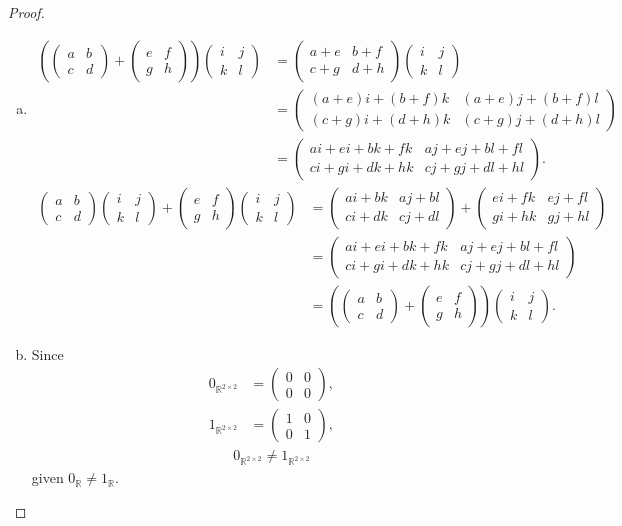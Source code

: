 \documentclass{amsart}
\newcommand{\bbr}{\mathbb{R}}
\newcommand{\aaa}{\left(\begin{smallmatrix}a&b\\c&d\end{smallmatrix}\right)}
\newcommand{\bbb}{\left(\begin{smallmatrix}e&f\\g&h\end{smallmatrix}\right)}
\newcommand{\ccc}{\left(\begin{smallmatrix}i&j\\k&l\end{smallmatrix}\right)}
\theoremstyle{plain}
\theoremstyle{definition}
\begin{document}
\begin{proof}
\begin{enumerate}[(a)]
		\item
			\begin{align*}
			\left(\aaa + \bbb\right)\ccc &= \left(\begin{smallmatrix}a+e&b+f\\c+g&d+h\end{smallmatrix}\right)\ccc \\ &= \left(\begin{smallmatrix}(a+e)i+(b+f)k&(a+e)j+(b+f)l\\(c+g)i+(d+h)k&(c+g)j+(d+h)l\end{smallmatrix}\right) \\ &= \left(\begin{smallmatrix}ai+ei+bk+fk&aj+ej+bl+fl\\ci+gi+dk+hk&cj+gj+dl+hl\end{smallmatrix}\right).
			\end{align*}
			\begin{align*}
			\aaa\ccc+\bbb\ccc &= \left(\begin{smallmatrix}ai+bk&aj+bl\\ci+dk&cj+dl\end{smallmatrix}\right)+\left(\begin{smallmatrix}ei+fk&ej+fl\\gi+hk&gj+hl\end{smallmatrix}\right) \\ &= \left(\begin{smallmatrix}ai+ei+bk+fk&aj+ej+bl+fl\\ci+gi+dk+hk&cj+gj+dl+hl\end{smallmatrix}\right) \\ &= \left(\aaa + \bbb\right)\ccc.
			\end{align*}
			\item 
			Since 
		\begin{align*}
			0_{\bbr^{2\times 2}} &= \left(\begin{smallmatrix}0&0\\0&0\end{smallmatrix}\right),\\
        	1_{\bbr^{2\times 2}} &= \left(\begin{smallmatrix}1&0\\0&1\end{smallmatrix}\right),
        \end{align*}
        \begin{align*}
        	0_{\bbr^{2\times 2}} \neq 1_{\bbr^{2\times 2}}
    	\end{align*}
    	given $0_{\bbr} \neq 1_{\bbr}$.
	\end{enumerate}


\end{proof}
\end{document}

